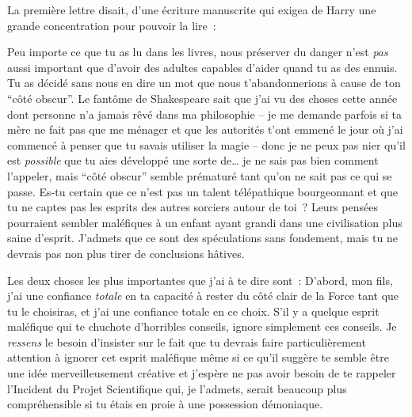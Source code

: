 La première lettre disait, d'une écriture manuscrite qui exigea de Harry une grande concentration pour pouvoir la lire~:
\begin{writtenNote}

Peu importe ce que tu as lu dans les livres, nous préserver du danger n'est \emph{pas} aussi important que d'avoir des adultes capables d'aider quand tu as des ennuis. Tu as décidé sans nous en dire un mot que nous t'abandonnerions à cause de ton “côté obscur”. Le fantôme de Shakespeare sait que j'ai vu des choses cette année dont personne n'a jamais rêvé dans ma philosophie -- je me demande parfois si ta mère ne fait pas que me ménager et que les autorités t'ont emmené le jour où j'ai commencé à penser que tu savais utiliser la magie -- donc je ne peux pas nier qu'il est \emph{possible} que tu aies développé une sorte de… je ne sais pas bien comment l'appeler, mais “côté obscur” semble prématuré tant qu'on ne sait pas ce qui se passe. Es-tu certain que ce n'est pas un talent télépathique bourgeonnant et que tu ne captes pas les esprits des autres sorciers autour de toi~? Leurs pensées pourraient sembler maléfiques à un enfant ayant grandi dans une civilisation plus saine d'esprit. J'admets que ce sont des spéculations sans fondement, mais tu ne devrais pas non plus tirer de conclusions hâtives.

Les deux choses les plus importantes que j'ai à te dire sont~: D'abord, mon fils, j'ai une confiance \emph{totale} en ta capacité à rester du côté clair de la Force tant que tu le choisiras, et j'ai une confiance totale en ce choix. S'il y a quelque esprit maléfique qui te chuchote d'horribles conseils, ignore simplement ces conseils. Je \emph{ressens} le besoin d'insister sur le fait que tu devrais faire particulièrement attention à ignorer cet esprit maléfique même si ce qu'il suggère te semble être une idée merveilleusement créative et j'espère ne pas avoir besoin de te rappeler l'Incident du Projet Scientifique qui, je l'admets, serait beaucoup plus compréhensible si tu étais en proie à une possession démoniaque.


\end{writtenNote}
